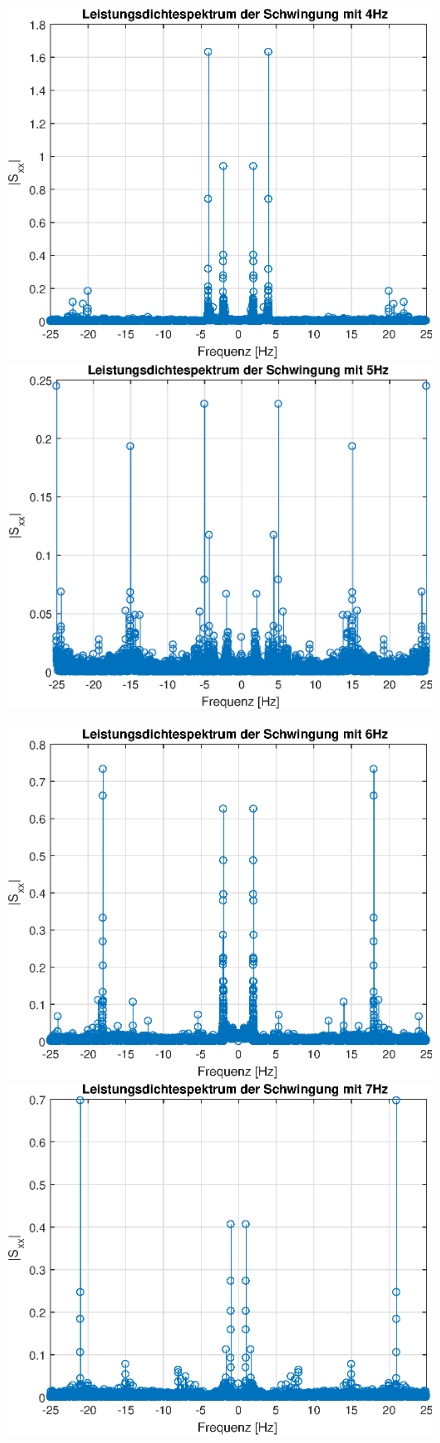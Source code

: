 \documentclass{article}
\begin{document}
\begin{figure}[!h]
\includegraphics[width=0.5\linewidth]{img/lds_sinefreq_4}
\includegraphics[width=0.5\linewidth]{img/lds_sinefreq_5}
\end{figure}
\begin{figure}[!h]
\includegraphics[width=0.5\linewidth]{img/lds_sinefreq_6}
\includegraphics[width=0.5\linewidth]{img/lds_sinefreq_7}
\end{figure}
\end{document}
